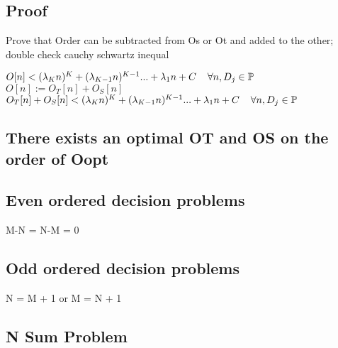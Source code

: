 \documentclass[11pt]{article}
\begin{document}
\subsection{Proof}
Prove that Order can be subtracted from Os or Ot and added to the other; double check cauchy schwartz inequal
\begin{center}
$
O[n] < (\lambda_K n)^K + (\lambda_{K-1} n)^{K-1}... + \lambda_1 n + C \hspace{4mm} \forall n, D_j \in \mathbb{P}
$
\\ \vspace{2mm}
$
O[n] := O_T[n] + O_S[n]
$
\\ \vspace{2mm}
$
O_T[n] + O_S[n] < (\lambda_K n)^K + (\lambda_{K-1} n)^{K-1}... + \lambda_1 n + C \hspace{4mm} \forall n, D_j \in \mathbb{P}
$
\end{center}







\subsection{There exists an optimal OT and OS on the order of Oopt}

\subsection{Even ordered decision problems}
M-N = N-M = 0
\subsection{Odd ordered decision problems}
N = M + 1 or M = N + 1









\newpage
\subsection{N Sum Problem}
\end{document}
